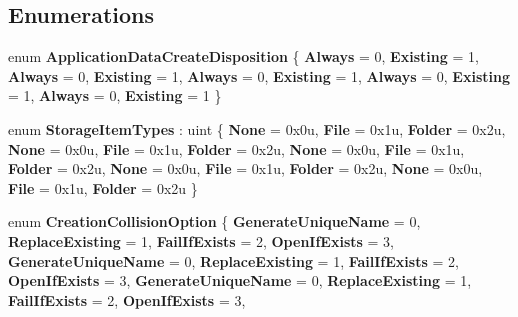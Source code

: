 \subsection*{Enumerations}
\begin{DoxyCompactItemize}
\item 
\mbox{\label{namespace_windows_1_1_storage_ad31753d0e1a55938e5b849af2661f220}} 
enum {\bfseries Application\+Data\+Create\+Disposition} \{ \newline
{\bfseries Always} = 0, 
{\bfseries Existing} = 1, 
{\bfseries Always} = 0, 
{\bfseries Existing} = 1, 
\newline
{\bfseries Always} = 0, 
{\bfseries Existing} = 1, 
{\bfseries Always} = 0, 
{\bfseries Existing} = 1, 
\newline
{\bfseries Always} = 0, 
{\bfseries Existing} = 1
 \}
\item 
\mbox{\label{namespace_windows_1_1_storage_afbbba3be392001933e27301572dd9adc}} 
enum {\bfseries Storage\+Item\+Types} \+: uint \{ \newline
{\bfseries None} = 0x0u, 
{\bfseries File} = 0x1u, 
{\bfseries Folder} = 0x2u, 
{\bfseries None} = 0x0u, 
\newline
{\bfseries File} = 0x1u, 
{\bfseries Folder} = 0x2u, 
{\bfseries None} = 0x0u, 
{\bfseries File} = 0x1u, 
\newline
{\bfseries Folder} = 0x2u, 
{\bfseries None} = 0x0u, 
{\bfseries File} = 0x1u, 
{\bfseries Folder} = 0x2u, 
\newline
{\bfseries None} = 0x0u, 
{\bfseries File} = 0x1u, 
{\bfseries Folder} = 0x2u
 \}
\item 
\mbox{\label{namespace_windows_1_1_storage_a47f58c5ed62127e58f4cd3b2e14d0bfb}} 
enum {\bfseries Creation\+Collision\+Option} \{ \newline
{\bfseries Generate\+Unique\+Name} = 0, 
{\bfseries Replace\+Existing} = 1, 
{\bfseries Fail\+If\+Exists} = 2, 
{\bfseries Open\+If\+Exists} = 3, 
\newline
{\bfseries Generate\+Unique\+Name} = 0, 
{\bfseries Replace\+Existing} = 1, 
{\bfseries Fail\+If\+Exists} = 2, 
{\bfseries Open\+If\+Exists} = 3, 
\newline
{\bfseries Generate\+Unique\+Name} = 0, 
{\bfseries Replace\+Existing} = 1, 
{\bfseries Fail\+If\+Exists} = 2, 
{\bfseries Open\+If\+Exists} = 3, 

\end{DoxyCompactItemize}
